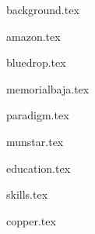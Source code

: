 \documentclass[11pt]{article}
\begin{document}
{background.tex}


{amazon.tex}

{bluedrop.tex}

{memorialbaja.tex}

{paradigm.tex}

{munstar.tex}




{education.tex}


{skills.tex}


{copper.tex}


\end{document}
